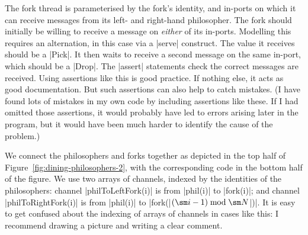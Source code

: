 The fork thread is parameterised by the fork's identity, and in-ports on which
it can receive messages from its left- and right-hand philosopher.  The fork
should initially be willing to receive a message on \emph{either} of its
in-ports.  Modelling this requires an alternation, in this case via a |serve|
construct.  The value it receives should be a |Pick|.  It then waits to
receive a second message on the same in-port, which should be a |Drop|.  The
|assert| statements check the correct messages are received.  Using
assertions like this is good practice.  If nothing else, it
acts as good documentation.  But such assertions can also help to catch
mistakes.  (I have found lots of mistakes in my own code by including
assertions like these.  If I had omitted those assertions, it would probably
have led to errors arising later in the program, but it would have been much
harder to identify the cause of the problem.)

We connect the philosophers and forks together as depicted in the top half of
Figure~\ref{fig:dining-philosophers-2}, with the corresponding code in the
bottom half of the figure.  We use two arrays of channels, indexed by the
identities of the philosophers: channel |philToLeftFork(i)| is from |phil(i)|
to |fork(i)|; and channel |philToRightFork(i)| is from |phil(i)| to
|fork(|$(\sm i-1) \bmod \sm N$|)|.  It is easy to get confused about the
indexing of arrays of channels in cases like this: I recommend drawing a
picture and writing a clear comment.  


